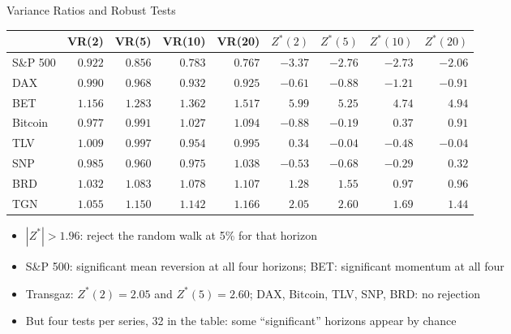 \begin{frame}{Variance Ratios and Robust Tests}
\itemsize{\footnotesize}
\begin{center}
\scriptsize
\begin{tabular}{lrrrrrrrr}
\toprule
& VR(2) & VR(5) & VR(10) & VR(20) & $Z^*(2)$ & $Z^*(5)$ & $Z^*(10)$ & $Z^*(20)$ \\
\midrule
S\&P 500 & $0.922$ & $0.856$ & $0.783$ & $0.767$ & ${-3.37}$ & ${-2.76}$ & ${-2.73}$ & ${-2.06}$ \\
DAX & $0.990$ & $0.968$ & $0.932$ & $0.925$ & ${-0.61}$ & ${-0.88}$ & ${-1.21}$ & ${-0.91}$ \\
BET & $1.156$ & $1.283$ & $1.362$ & $1.517$ & ${5.99}$ & ${5.25}$ & ${4.74}$ & ${4.94}$ \\
Bitcoin & $0.977$ & $0.991$ & $1.027$ & $1.094$ & ${-0.88}$ & ${-0.19}$ & ${0.37}$ & ${0.91}$ \\
TLV & $1.009$ & $0.997$ & $0.954$ & $0.995$ & ${0.34}$ & ${-0.04}$ & ${-0.48}$ & ${-0.04}$ \\
SNP & $0.985$ & $0.960$ & $0.975$ & $1.038$ & ${-0.53}$ & ${-0.68}$ & ${-0.29}$ & ${0.32}$ \\
BRD & $1.032$ & $1.083$ & $1.078$ & $1.107$ & ${1.28}$ & ${1.55}$ & ${0.97}$ & ${0.96}$ \\
TGN & $1.055$ & $1.150$ & $1.142$ & $1.166$ & ${2.05}$ & ${2.60}$ & ${1.69}$ & ${1.44}$ \\
\bottomrule
\end{tabular}
\end{center}
\begin{itemize}
    \item $|Z^*| > 1.96$: reject the random walk at 5\% for that horizon
    \item S\&P 500: significant mean reversion at all four horizons; BET: significant momentum at all four
    \item Transgaz: $Z^*(2) = 2.05$ and $Z^*(5) = 2.60$; DAX, Bitcoin, TLV, SNP, BRD: no rejection
    \item But four tests per series, 32 in the table: some ``significant'' horizons appear by chance
\end{itemize}
\end{frame}

